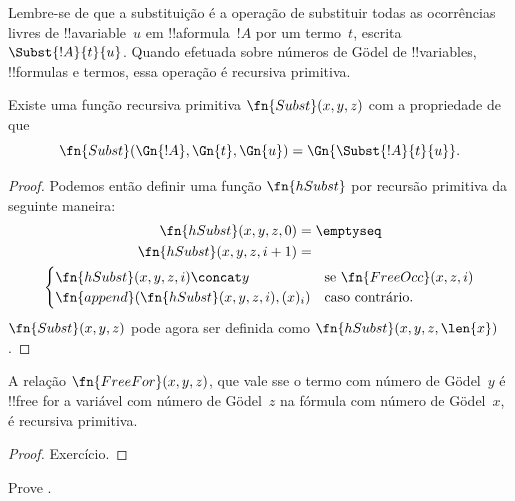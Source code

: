 \documentclass[../../../include/open-logic-section]{subfiles}
\begin{document}

Lembre-se de que a substituição é a operação de substituir todas as
ocorrências livres de !!a{variable}~$u$ em !!a{formula}~$!A$ por um
termo~$t$, escrita $\Subst{!A}{t}{u}$. Quando efetuada sobre
números de G\"odel de !!{variable}s, !!{formula}s e termos, essa
operação é recursiva primitiva.

\begin{prop}
Existe uma função recursiva primitiva $\fn{Subst}(x, y, z)$ com a
propriedade de que
\[
\fn{Subst}(\Gn{!A}, \Gn{t}, \Gn{u}) = \Gn{\Subst{!A}{t}{u}}.
\]
\end{prop}

\begin{proof}
Podemos então definir uma função $\fn{hSubst}$ por recursão primitiva
da seguinte maneira:
\begin{multline*}
\begin{aligned}
\fn{hSubst}(x, y, z, 0) & = \emptyseq \\
\fn{hSubst}(x, y, z, i+1) & =
\end{aligned}\\
\begin{cases}
\fn{hSubst}(x, y, z, i) \concat y & \text{se $\fn{FreeOcc}(x, z, i)$} \\
\fn{append}(\fn{hSubst}(x, y, z, i), (x)_{i}) & \text{caso contrário.}
\end{cases}
\end{multline*}
$\fn{Subst}(x, y, z)$ pode agora ser definida como
$\fn{hSubst}(x, y, z, \len{x})$.
\end{proof}

\begin{prop}
A relação $\fn{FreeFor}(x, y, z)$, que vale sse o termo com número de
G\"odel~$y$ é !!{free for} a variável com número de G\"odel~$z$ na
fórmula com número de G\"odel~$x$, é recursiva primitiva.
\end{prop}

\begin{proof} Exercício. \end{proof}

\begin{prob}
Prove .
\end{prob}
\end{document}
